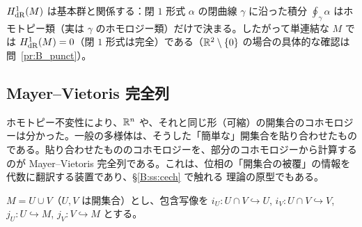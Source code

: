\begin{rem}[単連結性との関係]
$H^1_{\rm dR}(M)$ は基本群と関係する：閉 $1$ 形式 $\alpha$ の閉曲線 $\gamma$ に沿った積分 $\oint_\gamma\alpha$ はホモトピー類（実は $\gamma$ のホモロジー類）だけで決まる。したがって単連結な $M$ では $H^1_{\rm dR}(M)=0$（閉 $1$ 形式は完全）である\tC（$\mathbb R^2\setminus\{0\}$ の場合の具体的な確認は問~\ref{pr:B_punct}）。
\end{rem}

\subsection{Mayer--Vietoris 完全列}\label{B:ss:MV}

ホモトピー不変性により、$\mathbb R^n$ や、それと同じ形（可縮）の開集合のコホモロジーは分かった。一般の多様体は、そうした「簡単な」開集合を貼り合わせたものである。貼り合わせたもののコホモロジーを、部分のコホモロジーから計算するのが Mayer--Vietoris 完全列である。これは、位相の「開集合の被覆」の情報を代数に翻訳する装置であり、\S\ref{B:ss:cech} で触れる {\Cech} 理論の原型でもある。

$M=U\cup V$（$U,V$ は開集合）とし、包含写像を $i_U:U\cap V\hookrightarrow U$, $i_V:U\cap V\hookrightarrow V$, $j_U:U\hookrightarrow M$, $j_V:V\hookrightarrow M$ とする。


